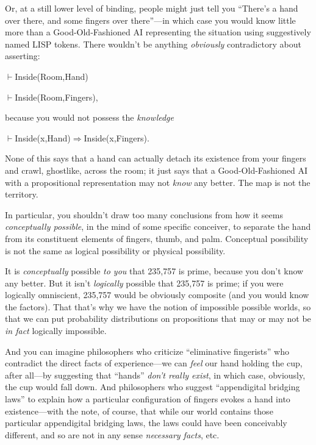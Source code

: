 {
 Or, at a still lower level of binding, people might just tell you
``There's a hand over there, and some
fingers over there''---in which case you would know
little more than a Good-Old-Fashioned AI representing the situation
using suggestively named LISP tokens. There wouldn't be
anything \textit{obviously} contradictory about asserting:}

{
 ${\vdash}$Inside(Room,Hand)}

{
 ${\vdash}${\textlnot}Inside(Room,Fingers),}

{
 because you would not possess the \textit{knowledge}}

{
 ${\vdash}$Inside(x,Hand)$\Rightarrow $Inside(x,Fingers).}

{
 None of this says that a hand can actually detach its existence
from your fingers and crawl, ghostlike, across the room; it just says
that a Good-Old-Fashioned AI with a propositional representation may
not \textit{know} any better. The map is not the territory.}

{
 In particular, you shouldn't draw too many
conclusions from how it seems \textit{conceptually possible}, in the
mind of some specific conceiver, to separate the hand from its
constituent elements of fingers, thumb, and palm. Conceptual
possibility is not the same as logical possibility or physical
possibility.}

{
 It is \textit{conceptually} possible \textit{to you} that 235,757
is prime, because you don't know any better. But it
isn't \textit{logically} possible that 235,757 is
prime; if you were logically omniscient, 235,757 would be obviously
composite (and you would know the factors). That that's
why we have the notion of impossible possible worlds, so that we can
put probability distributions on propositions that may or may not be
\textit{in fact} logically impossible.}

{
 And you can imagine philosophers who criticize
``eliminative fingerists'' who
contradict the direct facts of experience---we can \textit{feel} our
hand holding the cup, after all---by suggesting that
``hands''
\textit{don't really exist}, in which case, obviously,
the cup would fall down. And philosophers who suggest
``appendigital bridging laws'' to
explain how a particular configuration of fingers evokes a hand into
existence---with the note, of course, that while our world contains
those particular appendigital bridging laws, the laws could have been
conceivably different, and so are not in any sense \textit{necessary
facts}, etc.}

